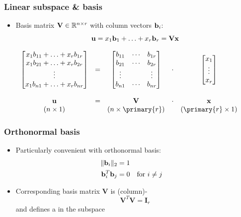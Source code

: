 \documentclass[t]{beamer} %
\begin{document}
\begin{frame}
  \frametitle{Linear subspace \& basis}
  
  \begin{itemize}
  \item Basis matrix $\mathbf{V} \in \mathbb{R}^{n\times r}$ with column vectors $\vb_i$:
    \[
    \vu = x_1 \vb_1 + \ldots + x_r \vb_r = \mathbf{V} \vx
    \]
  \end{itemize}

  \[
  \begin{array}{ccccc}
    \begin{bmatrix}
      x_1 b_{11} + \ldots + x_r b_{1r} \\
      x_1 b_{21} + \ldots + x_r b_{2r} \\
      \vdots\\
      x_1 b_{n1} + \ldots + x_r b_{nr}
    \end{bmatrix}
    & = &
    \begin{bmatrix}
      b_{11} & \cdots & b_{1r} \\
      b_{21} & \cdots & b_{2r} \\
      \vdots & & \vdots \\
      b_{n1} & \cdots & b_{nr}
    \end{bmatrix}
    & \cdot &
    \begin{bmatrix}
      x_1 \\
      \vdots \\
      x_r
    \end{bmatrix} \\
    \\
    \mathbf{u} & = & \mathbf{V} & \cdot & \mathbf{x} \\
    (n\times 1) & & (n\times \primary{r}) & & (\primary{r}\times 1)
  \end{array}
  \]

\end{frame}

\begin{frame}
  \frametitle{Orthonormal basis}

  \begin{itemize}
  \item Particularly convenient with orthonormal basis:
    \begin{align*}
      \norm[2]{\vb_i} &= 1 \\
      \vb_i^T \vb_j &= 0 && \text{for } i\neq j
    \end{align*}
  \item Corresponding basis matrix $\mathbf{V}$ is (column)-
    \[
      \mathbf{V}^T \mathbf{V} = \mathbf{I}_r
    \]
    and defines a  in the subspace
  \end{itemize}
\end{frame}
\end{document}
